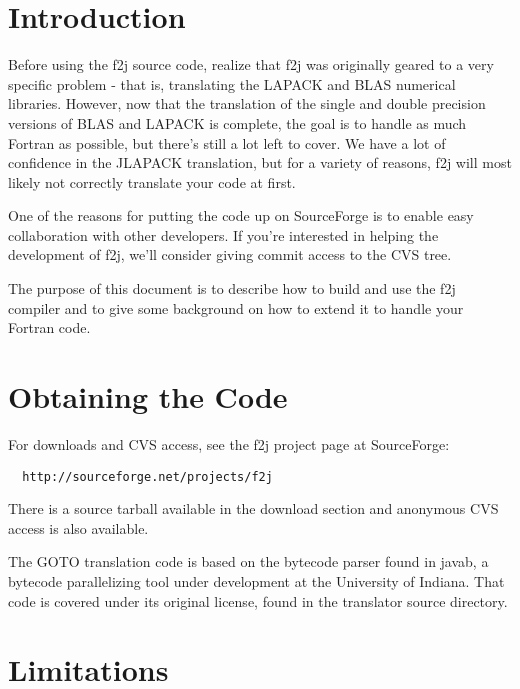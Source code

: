 \documentclass[11pt]{article}
\begin{document}


%

\newpage
{}
\setcounter{page}{1}

\section{Introduction}

Before using the f2j source code, realize that f2j was originally geared
to a very specific problem - that is, translating the LAPACK and BLAS numerical
libraries.  However, now that the translation of the single and double precision
versions of BLAS and LAPACK is complete, the goal is
to handle as much Fortran as possible, but there's still a lot left to cover.
We have a lot of confidence in the JLAPACK translation, but for a variety of
reasons, f2j will most likely not correctly translate your code at first.

One of the reasons for putting the code up on SourceForge is to enable easy
collaboration with other developers.  If you're interested in helping the
development of f2j, we'll consider giving commit access to the CVS tree.

The purpose of this document is to describe how to build and use the f2j compiler and
to give some background on how to extend it to handle your Fortran code. 

\section{Obtaining the Code}

For downloads and CVS access, see the f2j project page at SourceForge:

\begin{verbatim}
  http://sourceforge.net/projects/f2j
\end{verbatim}

There is a source tarball available in the download section and anonymous
CVS access is also available.

The GOTO translation code is based on the bytecode parser found in javab, a
bytecode parallelizing tool under development at the University of Indiana.
That code is covered under its original license, found in the translator source
directory.

\section{Limitations}
\end{document}
